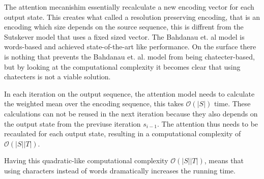 The attention mecanishim essentially recalculate a new encoding vector for each output state. This creates what called a resolution preserving encoding, that is an encoding which size depends on the source sequence, this is diffrent from the Sutskever model that uses a fixed sized vector. The Bahdanau et. al model is words-based and achieved state-of-the-art like performance. On the surface there is nothing that prevents the Bahdanau et. al. model from being chatecter-based, but by looking at the computational complexity it becomes clear that using chatecters is not a viable solution.

In each iteration on the output sequence, the attention model needs to calculate the weighted mean over the encoding sequence, this takes $\mathcal{O}(|S|)$ time. These calculations can not be reused in the next iteration because they also depends on the output state from the previuse iteration $s_{i-1}$. The attention thus needs to be recaulated for each output state, resulting in a computational complexity of $\mathcal{O}(|S||T|)$.

Having this quadratic-like computational complexity $\mathcal{O}(|S||T|)$, means that using characters instead of words dramatically increases the running time.

